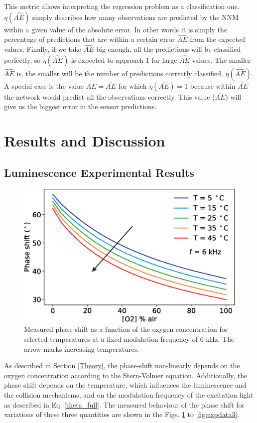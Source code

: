 \documentclass[9pt,twocolumn,twoside,pdftex]{optica}
\begin{document}
This metric allows interpreting the regression problem as a classification one. $\eta(\hat{AE})$ simply describes how many observations are predicted by the NNM within a given value of the absolute error. In other words it is simply the percentage of predictions that are within a certain error $\hat{AE}$ from the expected values. Finally, if we take $\hat{AE}$ big enough, all the predictions will be classified perfectly, so $\eta(\hat{AE})$ is expected to approach 1 for large $\hat{AE}$ values. The smaller $\hat{AE}$ is, the smaller will be the number of predictions correctly classified.
$\eta(\hat{AE})$.
A special case is the value $AE=\overline{AE}$ for which $\eta(\overline{AE})=1$ because within $\overline{AE}$ the network would predict all the observations correctly. This value ($\overline{AE}$) will give us the biggest error in the sensor predictions.


\section{Results and Discussion}
\label{Results}

\subsection{Luminescence Experimental Results}

\begin{figure}[b!]
\centering
\includegraphics[width=8.2 cm]{phase_O2_T.eps}
\caption{Measured phase shift as a function of the oxygen concentration for selected temperatures at a fixed modulation frequency of 6 kHz. The arrow marks increasing temperatures.}
\label{fig:expdata1}
\end{figure}

As described in Section \ref{Theory}, the phase-shift non-linearly depends on the oxygen concentration according to the Stern-Volmer equation. Additionally, the phase shift depends on the temperature, which influences the luminescence and the collision mechanisms, and on the modulation frequency of the excitation light as described in Eq. \ref{theta_full}. The measured behaviour of the phase shift for variations of these three quantities are shown in the Figs. \ref{fig:expdata1} to \ref{fig:expdata3}.
\end{document}
